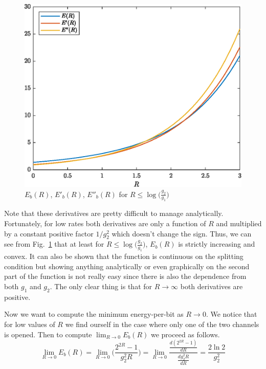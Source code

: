 \begin{figure}[t]
	\centering
	\includegraphics[width=0.7\linewidth]{img/energy_per_bit_1.eps}
	\caption{$E_b(R)$, $E'_b(R)$, $E''_b(R)$ for $R \leq \log\Big(\frac{g_2}{g_1}\Big)$ }
	\label{fig:funcex2}
\end{figure}

Note that these derivatives are pretty difficult to manage analytically. Fortunately, for low rates both derivatives are only a function of $R$ and multiplied by a constant positive factor $1/g_2^2$ which doesn't change the sign. Thus, we can see from Fig.~\ref{fig:funcex2} that at least for $R \leq \log\Big(\frac{g_2}{g_1}\Big)$, $E_b(R)$ is strictly increasing and convex. It can also be shown that the function is continuous on the splitting condition but showing anything analytically or even graphically on the second part of the function is not really easy since there is also the dependence from both $g_1$ and $g_2$. The only clear thing is that for $R \rightarrow \infty$ both derivatives are positive.

Now we want to compute the minimum energy-per-bit as $R \rightarrow 0$. We notice that for low values of $R$ we find ourself in the case where only one of the two channels is opened. Then to compute $\lim_{R \rightarrow 0} E_b(R)$ we proceed as follows.
%
\begin{equation}
	\lim_{R \rightarrow 0} E_b(R) =
		\lim_{R \rightarrow 0} \Big(\frac{2^{2R}-1}{g_2^2 R}\Big) = \lim_{R \rightarrow 0} \frac{ \frac{d(2^{2R}-1)}{dR}} {\frac{dg_2^2 R}{dR}}=\frac{2\ln{2}}{g_2^2}
\end{equation}

